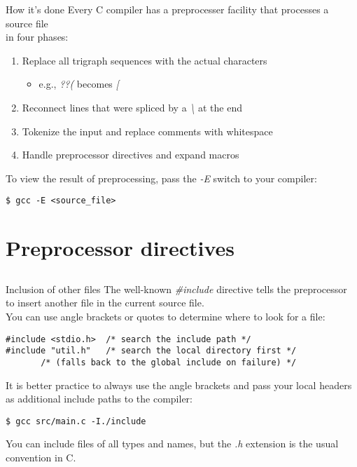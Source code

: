 \begin{frame}[fragile]{How it's done}
	Every C compiler has a preprocesser facility that processes a source file\\
	in four phases:\\
	\begin{enumerate}
		\item Replace all trigraph sequences with the actual characters
		\begin{itemize}
			\item e.g., \textit{??(} becomes \textit{[}
		\end{itemize}
		\item Reconnect lines that were spliced by a \textit{\textbackslash} at the end
		\item Tokenize the input and replace comments with whitespace
		\item Handle preprocessor directives and expand macros
	\end{enumerate}
	\bigskip
	To view the result of preprocessing, pass the \textit{-E} switch to your compiler:
	\begin{lstlisting}[numbers=none]
$ gcc -E <source_file>
\end{lstlisting}
\end{frame}

\section{Preprocessor directives}
\subsection{}

\begin{frame}[fragile]{Inclusion of other files}
	The well-known \textit{\#include} directive tells the preprocessor to insert
	another file in the current source file.\\
	\bigskip
	You can use angle brackets or quotes to determine where to look for a file:
	\begin{lstlisting}[numbers=none]
#include <stdio.h>	/* search the include path */
#include "util.h"	/* search the local directory first */
	   /* (falls back to the global include on failure) */
\end{lstlisting}
	It is better practice to always use the angle brackets and pass your local
	headers as additional include paths to the compiler:
	\begin{lstlisting}[numbers=none]
$ gcc src/main.c -I./include
\end{lstlisting}
	\bigskip
	You can include files of all types and names, but the \textit{.h} extension
	is the usual convention in C.
\end{frame}

